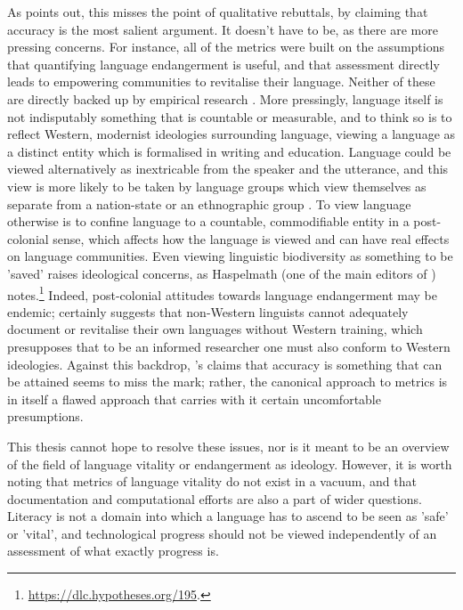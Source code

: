 As \citet{grenoble2016response} points out, this misses the point of qualitative rebuttals, by claiming that accuracy is the most salient argument. It doesn't have to be, as there are more pressing concerns. For instance, all of the metrics were built on the assumptions that quantifying language endangerment is useful, and that assessment directly leads to empowering communities to revitalise their language. Neither of these are directly backed up by empirical research \citep{grenoble2016response}. More pressingly, language itself is not indisputably something that is countable or measurable, and to think so is to reflect Western, modernist ideologies surrounding language, viewing a language as a distinct entity which is formalised in writing and education. Language could be viewed alternatively as inextricable from the speaker and the utterance, and this view is more likely to be taken by language groups which view themselves as separate from a nation-state or an ethnographic group \citep{bodo2017language}. To view language otherwise is to confine language to a countable, commodifiable entity in a post-colonial sense, which affects how the language is viewed and can have real effects on language communities. Even viewing linguistic biodiversity as something to be 'saved' raises ideological  concerns, as Haspelmath (one of the main editors of \citet{wals}) notes.\footnote{\href{https://dlc.hypotheses.org/195}{https://dlc.hypotheses.org/195}. } Indeed, post-colonial attitudes towards language endangerment may be endemic; \citet{newman1998we} certainly suggests that non-Western linguists cannot adequately document or revitalise their own languages without Western training, which presupposes that to be an informed researcher one must also conform to Western ideologies. Against this backdrop, \citet{lee2016assessing}'s claims that accuracy is something that can be attained seems to miss the mark; rather, the canonical approach to metrics is in itself a flawed approach that carries with it certain uncomfortable presumptions.

This thesis cannot hope to resolve these issues, nor is it meant to be an overview of the field of language vitality or endangerment as ideology. However, it is worth noting that metrics of language vitality do not exist in a vacuum, and that documentation and computational efforts are also a part of wider questions. Literacy is not a domain into which a language has to ascend to be seen as 'safe' or 'vital', and technological progress should not be viewed independently of an assessment of what exactly progress is.

